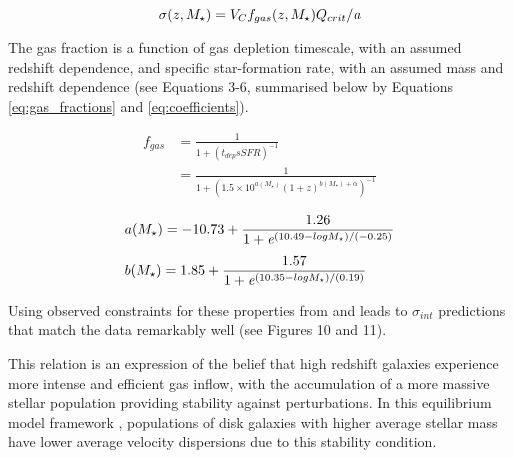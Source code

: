 \documentclass[fleqn,usenatbib]{mnras}
\begin{document}
\begin{equation}\label{eq:sigma_increase}
    \sigma(z,M_{\star}) = V_{C}f_{gas}(z,M_{\star})Q_{crit}/{\it a}
\end{equation}

\noindent
The gas fraction is a function of gas depletion timescale, with an assumed redshift dependence, and specific star-formation rate, with an assumed mass and redshift dependence (see \citealt{Wisnioski2015} Equations 3-6, summarised below by Equations \ref{eq:gas_fractions} and \ref{eq:coefficients}).

\begin{equation}\label{eq:gas_fractions}
\begin{aligned}
    f_{gas} & = \frac{1}{1 + \left(t_{dep}sSFR\right)^{-1}} \\[1ex]
    & = \frac{1}{1 + \left(1.5\times10^{a(M_{\star})}\left(1 + z \right)^{b(M_{\star}) + \alpha}\right)^{-1}}
\end{aligned}
\end{equation}

\begin{equation}\label{eq:coefficients}
\begin{aligned}
   & a(M_{\star}) = -10.73 + \frac{1.26}{1 + {\it e}^{\left(10.49 - logM_{\star}\right)/(-0.25)}} \\[1ex]
   & b(M_{\star}) = 1.85 + \frac{1.57}{1 + {\it e}^{\left(10.35 - logM_{\star}\right)/(0.19)}}
\end{aligned}
\end{equation}

\noindent
Using observed constraints for these properties from \cite{Tacconi2013} and \cite{Whitaker2014} leads to $\sigma_{int}$ predictions that match the data remarkably well (see \citealt{Wisnioski2015} Figures 10 and 11).

This relation is an expression of the belief that high redshift galaxies experience more intense and efficient gas inflow, with the accumulation of a more massive stellar population providing stability against perturbations.
In this equilibrium model framework \citep[e.g.][]{Dave2012,Lilly2013,Saintonge2013}, populations of disk galaxies with higher average stellar mass have lower average velocity dispersions due to this stability condition.
\end{document}
